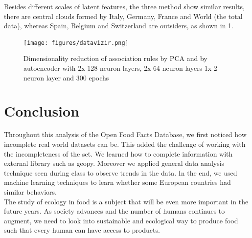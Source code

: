 \documentclass[11pt]{article}
\begin{document}
     


Besides different scales of latent features, the three method show similar results, there are central clouds formed by Italy, Germany, France and World (the total data), whereas Spain, Belgium and Switzerland are outsiders, as shown in \ref{fig:PCA}.
\begin{figure}[H]
    \centering
    \texttt{[image: figures/datavizir.png]}
    \caption{Dimensionality reduction of association rules by PCA and by autoencoder with 2x 128-neuron layers, 2x 64-neuron layers 1x 2-neuron layer and 300 epochs}
    \label{fig:PCA}
\end{figure}


 

\section{Conclusion}
Throughout this analysis of the Open Food Facts Database, we first noticed how incomplete real world datasets can be. This added the challenge of working with the incompleteness of the set. We learned how to complete information with external library such as geopy. Moreover we applied general data analysis technique seen during class to observe trends in the data. In the end, we used machine learning techniques to learn whether some European countries had similar behaviors. \\
The study of ecology in food is a subject that will be even more important in the future years. As society advances and the number of humans continues to augment, we need to look into sustainable and ecological way to produce food such that every human can have access to products. 
\end{document}
